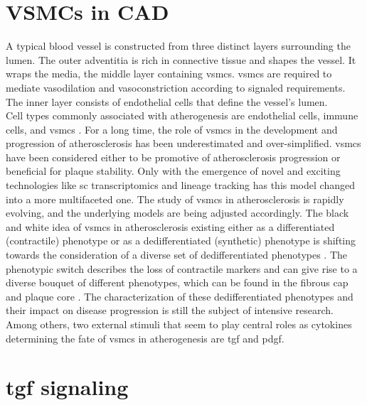 \section{VSMCs in CAD}
\label{sec:haosms}
A typical blood vessel is constructed from three distinct layers surrounding the lumen. The outer adventitia is rich in connective tissue and shapes the vessel. It wraps the media, the middle layer containing \acp{vsmc}. \acp{vsmc} are required to mediate vasodilation and vasoconstriction according to signaled requirements. The inner layer consists of endothelial cells that define the vessel's lumen. \cite{tuckerAnatomyBloodVessels2022a, yapSixShadesVascular2021}\\
Cell types commonly associated with atherogenesis are endothelial cells, immune cells, and \acp{vsmc} \cite{tabasRecentInsightsCellular2015}. For a long time, the role of \acp{vsmc} in the development and progression of atherosclerosis has been underestimated and over-simplified. \acp{vsmc} have been considered either to be promotive of atherosclerosis progression or beneficial for plaque stability. Only with the emergence of novel and exciting technologies like \ac{sc} transcriptomics and lineage tracking has this model changed into a more multifaceted one. \cite{liuSmoothMuscleCell2019, grootaertVascularSmoothMuscle2021, yapSixShadesVascular2021} The study of \acp{vsmc} in atherosclerosis is rapidly evolving, and the underlying models are being adjusted accordingly. The black and white idea of \acp{vsmc} in atherosclerosis existing either as a differentiated (contractile) phenotype or as a dedifferentiated (synthetic) phenotype is shifting towards the consideration of a diverse set of dedifferentiated phenotypes \cite{liuSmoothMuscleCell2019, grootaertVascularSmoothMuscle2021, yapSixShadesVascular2021}. The phenotypic switch describes the loss of contractile markers and can give rise to a diverse bouquet of different phenotypes, which can be found in the fibrous cap and plaque core \cite{grootaertVascularSmoothMuscle2021}. The characterization of these dedifferentiated phenotypes and their impact on disease progression is still the subject of intensive research.\\
Among others, two external stimuli that seem to play central roles as cytokines determining the fate of \acp{vsmc} in atherogenesis are \acf{tgf} and \acf{pdgf}.


\section{\acs{tgf} signaling}
\label{sec:tgf}


